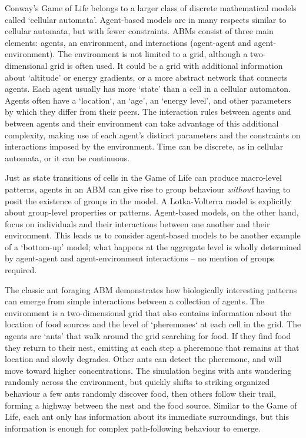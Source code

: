 \documentclass[11pt]{article}
\begin{document}


Conway's Game of Life belongs to a larger class of discrete mathematical models called `cellular automata'. Agent-based models are in many respects similar to cellular automata, but with fewer constraints. ABMs consist of three main elements: agents, an environment, and interactions (agent-agent and agent-environment). The environment is not limited to a grid, although a two-dimensional grid is often used. It could be a grid with additional information about `altitude' or energy gradients, or a more abstract network that connects agents. Each agent usually has more `state' than a cell in a cellular automaton. Agents often have a `location`, an `age', an `energy level', and other parameters by which they differ from their peers. The interaction rules between agents and between agents and their environment can take advantage of this additional complexity, making use of each agent's distinct parameters and the constraints on interactions imposed by the environment. Time can be discrete, as in cellular automata, or it can be continuous.

Just as state transitions of cells in the Game of Life can produce macro-level patterns, agents in an ABM can give rise to group behaviour \emph{without} having to posit the existence of groups in the model.  A Lotka-Volterra model is explicitly about group-level properties or patterns. Agent-based models, on the other hand, focus on individuals and their interactions between one another and their environment.  This leads us to consider agent-based models to be another example of a `bottom-up' model; what happens at the aggregate level is wholly determined by agent-agent and agent-environment interactions -- no mention of groups required.


The classic ant foraging ABM demonstrates how biologically interesting patterns can emerge from simple interactions between a collection of agents. The environment is a two-dimensional grid that also contains information about the location of food sources and the level of `pheremones` at each cell in the grid. The agents are `ants' that walk around the grid searching for food. If they find food they return to their nest, emitting at each step a pheremone that remains at that location and slowly degrades. Other ants can detect the pheremone, and will move toward higher concentrations. The simulation begins with ants wandering randomly across the environment, but quickly shifts to striking organized behaviour a few ants randomly discover food, then others follow their trail, forming a highway between the nest and the food source. Similar to the Game of Life, each ant only has information about its immediate surroundings, but this information is enough for complex path-following behaviour to emerge.
\end{document}
